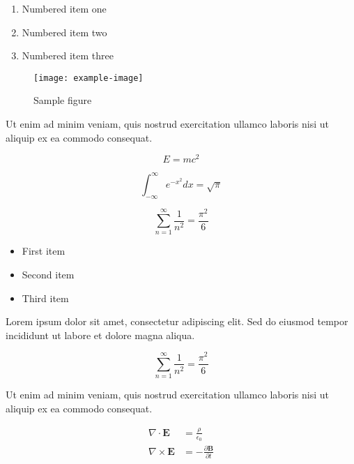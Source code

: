 \documentclass{article}
\begin{document}
\begin{enumerate}
\item Numbered item one
\item Numbered item two
\item Numbered item three
\end{enumerate}

\begin{figure}[h]
    \centering
    \texttt{[image: example-image]}
    \caption{Sample figure}
    \label{fig:sample}
\end{figure}

Ut enim ad minim veniam, quis nostrud exercitation ullamco laboris nisi ut aliquip ex ea commodo consequat.

\begin{equation}
    E = mc^2
\end{equation}

\begin{equation}
    \int_{-\infty}^{\infty} e^{-x^2} dx = \sqrt{\pi}
\end{equation}


\begin{equation}
    \sum_{n=1}^{\infty} \frac{1}{n^2} = \frac{\pi^2}{6}
\end{equation}

\begin{itemize}
\item First item
\item Second item
\item Third item
\end{itemize}

Lorem ipsum dolor sit amet, consectetur adipiscing elit. Sed do eiusmod tempor incididunt ut labore et dolore magna aliqua.

\begin{equation}
    \sum_{n=1}^{\infty} \frac{1}{n^2} = \frac{\pi^2}{6}
\end{equation}


Ut enim ad minim veniam, quis nostrud exercitation ullamco laboris nisi ut aliquip ex ea commodo consequat.

\begin{align}
    \nabla \cdot \mathbf{E} &= \frac{\rho}{\epsilon_0} \\
    \nabla \times \mathbf{E} &= -\frac{\partial \mathbf{B}}{\partial t}
\end{align}
\end{document}
